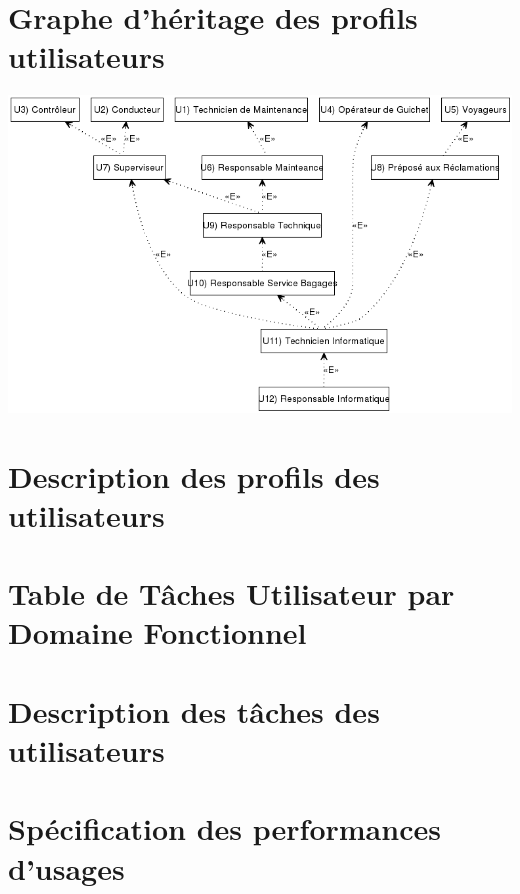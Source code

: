 \part{Graphe d'héritage des profils utilisateurs}
\begin{center}
\includegraphics[width=\linewidth]{../../GPU/src/img/GPU.png}
\end{center}
\newpage

\part{Description des profils des utilisateurs}

\newpage

\part{Table de Tâches Utilisateur par Domaine Fonctionnel}
\begin{center}
    
\end{center}

\part{Description des tâches des utilisateurs}

\newpage

\part{Spécification des performances d'usages}



